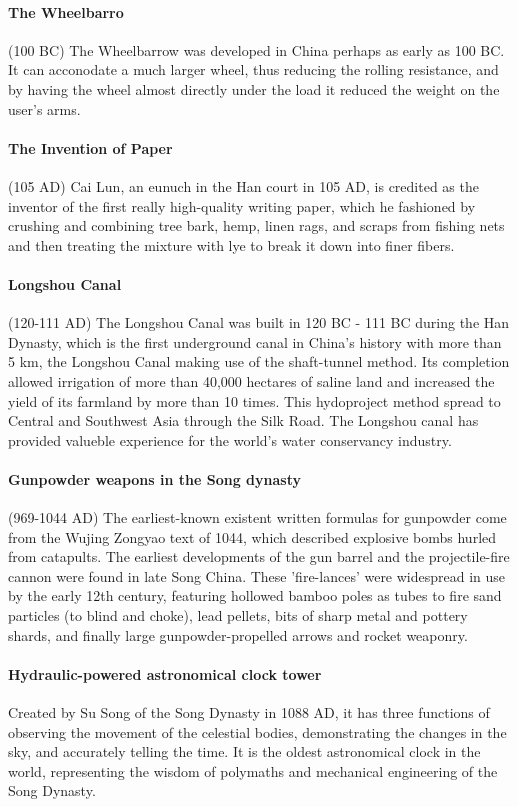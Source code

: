 \paragraph{The Wheelbarro} (100 BC)
The Wheelbarrow was developed in China perhaps as early as 100 BC. It can
acconodate a much larger wheel, thus reducing the rolling resistance, and by
having the wheel almost directly under the load it reduced the weight on the
user's arms.

\paragraph{The Invention of Paper} (105 AD)
Cai Lun, an eunuch in the Han court in 105 AD, is credited as the inventor of
the first really high-quality writing paper, which he fashioned by crushing
and combining tree bark, hemp, linen rags, and scraps from fishing nets and
then treating the mixture with lye to break it down into finer fibers.

\paragraph{Longshou Canal} (120-111 AD)
The Longshou Canal was built in 120 BC - 111 BC during the Han Dynasty, which
is the first underground canal in China's history with more than 5 km, the
Longshou Canal making use of the shaft-tunnel method. Its completion allowed
irrigation of more than 40,000 hectares of saline land and increased the yield
of its farmland by more than 10 times. This hydoproject method spread to Central
and Southwest Asia through the Silk Road. The Longshou canal has provided
valueble experience for the world's water conservancy industry.

\paragraph{Gunpowder weapons in the Song dynasty} (969-1044 AD)
The earliest-known existent written formulas for gunpowder come from the
Wujing Zongyao text of 1044, which described explosive bombs hurled from
catapults. The earliest developments of the gun barrel and the projectile-fire
cannon were found in late Song China. These 'fire-lances' were widespread in
use by the early 12th century, featuring hollowed bamboo poles as tubes to
fire sand particles (to blind and choke), lead pellets, bits of sharp metal
and pottery shards, and finally large gunpowder-propelled arrows and rocket
weaponry.

\paragraph{Hydraulic-powered astronomical clock tower}
Created by Su Song of the Song Dynasty in 1088 AD, it has three functions of
observing the movement of the celestial bodies, demonstrating the changes in
the sky, and accurately telling the time. It is the oldest astronomical clock
in the world, representing the wisdom of polymaths and mechanical engineering
of the Song Dynasty.

